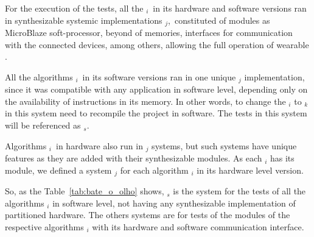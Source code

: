         For the execution of the tests, all the \A$ _i $\ in its hardware and software versions ran in synthesizable systemic implementations \Ss$ _j $,\ constituted of modules as MicroBlaze soft-processor, beyond of memories, interfaces for communication with the connected devices, among others, allowing the full operation of wearable \cite{obeidat2011microblaze}.
        
        All the algorithms \A$ _i $\ in its software versions ran in one unique \Ss$ _j $ implementation, since it was compatible with any application in software level, depending only on the availability of instructions in its memory.
        In other words, to change the \A$ _i $ to \A$ _k $ in this system need to recompile the project in software.
        The tests in this system will be referenced as \Ss$ _{s} $.
        
        Algorithms \A$ _i $\ in hardware also run in \Ss$ _j $ systems, but such systems have unique features as they are added with their synthesizable modules.
        As each \A$ _i $ has its module, we defined a system \Ss$ _j $ for each algorithm \A$ _i $ in its hardware level version.
        
        So, as the Table~\ref{tab:bate_o_olho} shows, \Ss$ _s $ is the system for the tests of all the algorithms \A$ _i $ in software level, not having any synthesizable implementation of partitioned hardware.
        The others systems are for tests of the modules of the respective algorithms \A$ _i $ with its hardware and software communication interface.
        
